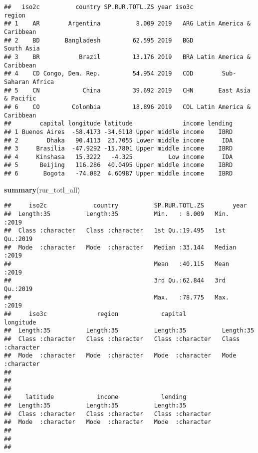 \documentclass[
]{article}
\newenvironment{Shaded}{\begin{snugshade}}{\end{snugshade}}
\newcommand{\KeywordTok}[1]{\textcolor[rgb]{0.13,0.29,0.53}{\textbf{#1}}}
\newcommand{\NormalTok}[1]{#1}
\begin{document}
\begin{verbatim}
##   iso2c          country SP.RUR.TOTL.ZS year iso3c                    region
## 1    AR        Argentina          8.009 2019   ARG Latin America & Caribbean
## 2    BD       Bangladesh         62.595 2019   BGD                South Asia
## 3    BR           Brazil         13.176 2019   BRA Latin America & Caribbean
## 4    CD Congo, Dem. Rep.         54.954 2019   COD        Sub-Saharan Africa
## 5    CN            China         39.692 2019   CHN       East Asia & Pacific
## 6    CO         Colombia         18.896 2019   COL Latin America & Caribbean
##        capital longitude latitude              income lending
## 1 Buenos Aires  -58.4173 -34.6118 Upper middle income    IBRD
## 2        Dhaka   90.4113  23.7055 Lower middle income     IDA
## 3     Brasilia  -47.9292 -15.7801 Upper middle income    IBRD
## 4     Kinshasa   15.3222   -4.325          Low income     IDA
## 5      Beijing   116.286  40.0495 Upper middle income    IBRD
## 6       Bogota   -74.082  4.60987 Upper middle income    IBRD
\end{verbatim}

\begin{Shaded}
\begin{Highlighting}[]
\KeywordTok{summary}\NormalTok{(rur_totl_all)}
\end{Highlighting}
\end{Shaded}

\begin{verbatim}
##     iso2c             country          SP.RUR.TOTL.ZS        year     
##  Length:35          Length:35          Min.   : 8.009   Min.   :2019  
##  Class :character   Class :character   1st Qu.:19.495   1st Qu.:2019  
##  Mode  :character   Mode  :character   Median :33.144   Median :2019  
##                                        Mean   :40.115   Mean   :2019  
##                                        3rd Qu.:62.844   3rd Qu.:2019  
##                                        Max.   :78.775   Max.   :2019  
##     iso3c              region            capital           longitude        
##  Length:35          Length:35          Length:35          Length:35         
##  Class :character   Class :character   Class :character   Class :character  
##  Mode  :character   Mode  :character   Mode  :character   Mode  :character  
##                                                                             
##                                                                             
##                                                                             
##    latitude            income            lending         
##  Length:35          Length:35          Length:35         
##  Class :character   Class :character   Class :character  
##  Mode  :character   Mode  :character   Mode  :character  
##                                                          
##                                                          
## 
\end{verbatim}
\end{document}
